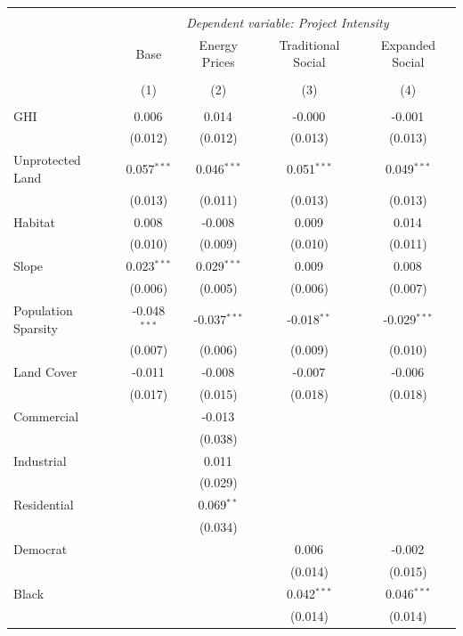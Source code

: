 \begin{table}[!htbp] \centering
\begin{tabular}{@{\extracolsep{5pt}}lcccc}
\\[-1.8ex]\hline
\hline \\[-1.8ex]
& \multicolumn{4}{c}{\textit{Dependent variable: Project Intensity}} \
\cr \cline{2-5}
\\[-1.8ex] & \multicolumn{1}{c}{Base} & \multicolumn{1}{c}{Energy Prices} & \multicolumn{1}{c}{Traditional Social} & \multicolumn{1}{c}{Expanded Social}  \\
\\[-1.8ex] & (1) & (2) & (3) & (4) \\
\hline \\[-1.8ex]
 GHI & 0.006$^{}$ & 0.014$^{}$ & -0.000$^{}$ & -0.001$^{}$ \\
& (0.012) & (0.012) & (0.013) & (0.013) \\
 Unprotected Land & 0.057$^{***}$ & 0.046$^{***}$ & 0.051$^{***}$ & 0.049$^{***}$ \\
& (0.013) & (0.011) & (0.013) & (0.013) \\
 Habitat & 0.008$^{}$ & -0.008$^{}$ & 0.009$^{}$ & 0.014$^{}$ \\
& (0.010) & (0.009) & (0.010) & (0.011) \\
 Slope & 0.023$^{***}$ & 0.029$^{***}$ & 0.009$^{}$ & 0.008$^{}$ \\
& (0.006) & (0.005) & (0.006) & (0.007) \\
 Population Sparsity & -0.048$^{***}$ & -0.037$^{***}$ & -0.018$^{**}$ & -0.029$^{***}$ \\
& (0.007) & (0.006) & (0.009) & (0.010) \\
 Land Cover & -0.011$^{}$ & -0.008$^{}$ & -0.007$^{}$ & -0.006$^{}$ \\
& (0.017) & (0.015) & (0.018) & (0.018) \\
 Commercial & & -0.013$^{}$ & & \\
& & (0.038) & & \\
 Industrial & & 0.011$^{}$ & & \\
& & (0.029) & & \\
 Residential & & 0.069$^{**}$ & & \\
& & (0.034) & & \\
 Democrat & & & 0.006$^{}$ & -0.002$^{}$ \\
& & & (0.014) & (0.015) \\
 Black & & & 0.042$^{***}$ & 0.046$^{***}$ \\
& & & (0.014) & (0.014) \\

\end{tabular}
\end{table}
